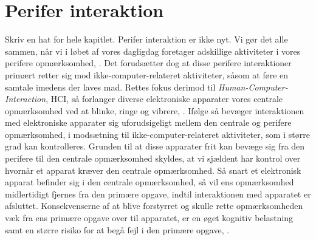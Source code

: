 \section{Perifer interaktion}
\label{PeriferInteratkion}
%
Skriv en hat for hele kapitlet. \blankline
%
Perifer interaktion er ikke nyt. Vi gør det alle sammen, når vi i løbet af vores dagligdag foretager adskillige aktiviteter i vores perifere opmærksomhed, \parencite[s. 1]{PDF:PIIntroduction}. Det forudsætter dog at disse perifere interaktioner primært retter sig mod ikke-computer-relateret aktiviteter, såsom at føre en samtale imedens der laves mad. Rettes fokus derimod til \textit{Human-Computer-Interaction}, HCI, så forlanger diverse elektroniske apparater vores centrale opmærksomhed ved at blinke, ringe og vibrere, \parencite[s. 1]{PDF:PIIntroduction}. Ifølge \textcite[s. 3]{PDF:PIIntroduction} så bevæger interaktionen med elektroniske apparater sig uforudsigeligt mellem den centrale og perifere opmærksomhed, i modsætning til ikke-computer-relateret aktiviteter, som i større grad kan kontrolleres. Grunden til at disse apparater frit kan bevæge sig fra den perifere til den centrale opmærksomhed skyldes, at vi sjældent har kontrol over hvornår et apparat kræver den centrale opmærksomhed. Så snart et elektronisk apparat befinder sig i den centrale opmærksomhed, så vil ens opmærksomhed midlertidigt fjernes fra den primære opgave, indtil interaktionen med apparatet er afsluttet. Konsekvenserne af at blive forstyrret og skulle rette opmærksomheden væk fra ens primære opgave over til apparatet, er en øget kognitiv belastning samt en større risiko for at begå fejl i den primære opgave, \parencite[ss. 188-189][s. 162]{PDF:PIDesktopComputingKap9, PDF:ComparingInputModalities}. 

